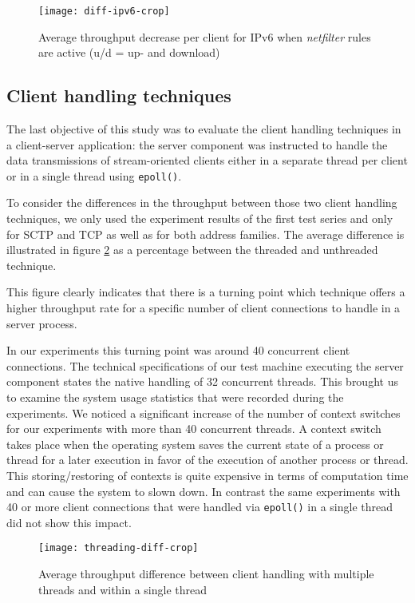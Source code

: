 \documentclass{sig-alternate}
\begin{document}
\begin{figure}[!t]
\texttt{[image: diff-ipv6-crop]}
\caption{Average throughput decrease per client for IPv6 when \emph{netfilter} 
rules are active (u/d = up- and download)}
\label{fig::diff6}
\end{figure}

\subsection{Client handling techniques}
\noindent The last objective of this study was to evaluate the client 
handling techniques in a client-server application: the server component was 
instructed to handle the data transmissions of stream-oriented clients either in 
a separate thread per client or in a single thread using \texttt{epoll()}.

To consider the differences in the throughput between those two client handling 
techniques, we only used the experiment results of the first test series and 
only for SCTP and TCP as well as for both address families. The average 
difference is illustrated in figure \ref{fig::threading} as a percentage 
between the threaded and unthreaded technique.

This figure clearly indicates that there is a turning point which technique 
offers a higher throughput rate for a specific number of client connections to 
handle in a server process.

\noindent In our experiments this turning point was around 40 concurrent client 
connections. The technical specifications of our test machine executing the 
server component states the native handling of 32 concurrent threads. This 
brought us to examine the system usage statistics that were recorded during the
experiments. We noticed a significant increase of the number of context 
switches for our experiments with more than 40 concurrent threads. A context 
switch takes place when the operating system saves the current state of a 
process or thread for a later execution in favor of the execution of another 
process or thread. This storing/restoring of contexts is quite expensive in 
terms of computation time and can cause the system to slown down. In 
contrast the same experiments with 40 or more client connections that were 
handled via \texttt{epoll()} in a single thread did not show this impact.

\begin{figure}[!t]
\texttt{[image: threading-diff-crop]}
\caption{Average throughput difference between client handling with multiple 
threads and within a single thread}
\label{fig::threading}
\end{figure}
\end{document}
